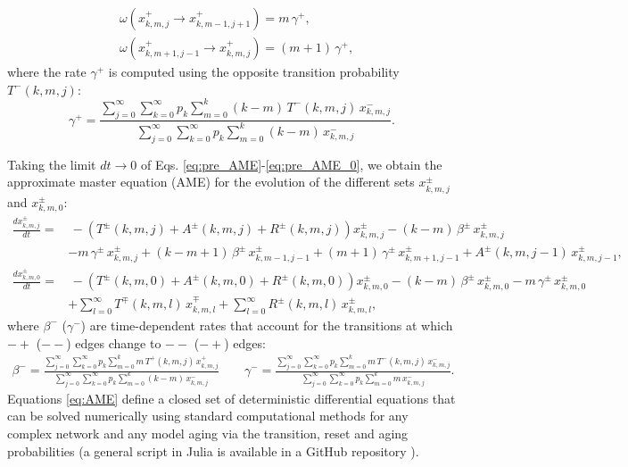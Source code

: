\begin{align} \label{rate_gamma_s}
    &  \omega (x^{+}_{k,m,j} \to x^{+}_{k,m-1,j+1}) = m\, \gamma^{+}, \nonumber \\
    & \omega (x^{+}_{k,m+1,j-1} \to x^{+}_{k,m,j}) = (m + 1)\, \gamma^{+} ,
\end{align}
where the rate $\gamma^{+}$ is computed using the opposite transition probability $T^{-}(k,m,j)$:
\begin{equation}
        \label{gamma_s}
        \gamma^{+} = \frac{\sum_{j=0}^{\infty} \sum_{k=0}^{\infty} p_k \sum_{m = 0}^{k} (k - m)\, T^{-} (k,m,j) \, x^{-}_{k,m,j}}{\sum_{j=0}^{\infty} \sum_{k=0}^{\infty} p_k \sum_{m = 0}^{k} (k - m)\,  x^{-}_{k,m,j}}.
\end{equation}
    
Taking the limit $dt \to 0$ of Eqs. \eqref{eq:pre_AME}-\eqref{eq:pre_AME_0}, we obtain the approximate master equation (AME) for the evolution of the different sets $x^{\pm}_{k,m,j}$ and $x^{\pm}_{k,m,0}$:
\begin{align}
\label{eq:AME}
    \frac{d x^{\pm}_{k,m,j}}{dt} = & \, - \left( T^{\pm} (k,m,j) + A^{\pm} (k,m,j) + R^{\pm} (k,m,j) \right) x^{\pm}_{k,m,j} - (k - m)\, \beta^{\pm}\,  x^{\pm}_{k,m,j} \nonumber\\
    & - m \, \gamma^{\pm}\, x^{\pm}_{k,m,j} + (k-m+1)\, \beta^{\pm} \,   x^{\pm}_{k,m-1,j-1} + (m+1)\, \gamma^{\pm} \,  x^{\pm}_{k,m+1,j-1} + A^{\pm} (k,m,j-1)\,  x^{\pm}_{k,m,j-1},  \\
    \frac{d x^{\pm}_{k,m,0}}{dt}  = & \, - \left( T^{\pm} (k,m,0) + A^{\pm} (k,m,0) + R^{\pm} (k,m,0) \right) x^{\pm}_{k,m,0} - (k - m) \, \beta^{\pm}\,  x^{\pm}_{k,m,0} - m\, \gamma^{\pm} \,  x^{\pm}_{k,m,0}\nonumber\\
    & + \sum_{l = 0}^{\infty} T^{\mp} (k,m,l)\,  x^{\mp}_{k,m,l} + \sum_{l = 0}^{\infty} R^{\pm} (k,m,l)\, x^{\pm}_{k,m,l},\nonumber
\end{align}
where $\beta^{-}$ ($\gamma^{-}$) are time-dependent rates that account for the transitions at which $-+$ ($--$) edges change to $--$ ($-+$) edges:
\begin{align}
    \beta^{-} = \frac{\sum_{j=0}^{\infty} \sum_{k=0}^{\infty} p_k \sum_{m = 0}^{k} m \, T^{+} (k,m,j) \, x^{+}_{k,m,j}}{\sum_{j=0}^{\infty} \sum_{k=0}^{\infty} p_k \sum_{m = 0}^{k} (k - m)\,  x^{-}_{k,m,j}} \quad \quad \gamma^{-} = \frac{\sum_{j=0}^{\infty} \sum_{k=0}^{\infty} p_k \sum_{m = 0}^{k} m\, T^{-} (k,m,j) \, x^{-}_{k,m,j}}{\sum_{j=0}^{\infty} \sum_{k=0}^{\infty} p_k \sum_{m = 0}^{k} m\,  x^{-}_{k,m,j}}.
\end{align}
Equations \ref{eq:AME} define a closed set of deterministic differential equations that can be solved numerically using standard computational methods for any complex network and any model aging via the transition, reset and aging probabilities (a general script in Julia is available in a GitHub repository \cite{link_git}).

